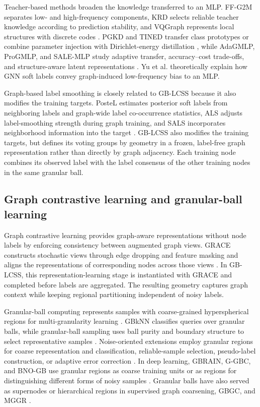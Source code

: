 \documentclass[10pt,letterpaper]{elsarticle}
\begin{document}
Teacher-based methods broaden the knowledge transferred to an MLP. FF-G2M separates low- and high-frequency components, KRD selects reliable teacher knowledge according to prediction stability, and VQGraph represents local structures with discrete codes \cite{ref6,ref7,ref26}. PGKD and TINED transfer class prototypes or combine parameter injection with Dirichlet-energy distillation \cite{ref28,ref43}, while AdaGMLP, ProGMLP, and SALE-MLP study adaptive transfer, accuracy--cost trade-offs, and structure-aware latent representations \cite{ref29,ref30,ref31}. Yu et al. \cite{ref32} theoretically explain how GNN soft labels convey graph-induced low-frequency bias to an MLP.

Graph-based label smoothing is closely related to GB-LCSS because it also modifies the training targets. PosteL estimates posterior soft labels from neighboring labels and graph-wide label co-occurrence statistics, ALS adjusts label-smoothing strength during graph training, and SALS incorporates neighborhood information into the target \cite{ref60,ref61,ref62}. GB-LCSS also modifies the training targets, but defines its voting groups by geometry in a frozen, label-free graph representation rather than directly by graph adjacency. Each training node combines its observed label with the label consensus of the other training nodes in the same granular ball.

\subsection{Graph contrastive learning and granular-ball learning}\label{sec:2.4}

Graph contrastive learning provides graph-aware representations without node labels by enforcing consistency between augmented graph views. GRACE constructs stochastic views through edge dropping and feature masking and aligns the representations of corresponding nodes across those views \cite{ref16}. In GB-LCSS, this representation-learning stage is instantiated with GRACE and completed before labels are aggregated. The resulting geometry captures graph context while keeping regional partitioning independent of noisy labels.

Granular-ball computing represents samples with coarse-grained hyperspherical regions for multi-granularity learning \cite{ref34}. GBkNN classifies queries over granular balls, while granular-ball sampling uses ball purity and boundary structure to select representative samples \cite{ref34,ref37}. Noise-oriented extensions employ granular regions for coarse representation and classification, reliable-sample selection, pseudo-label construction, or adaptive error correction \cite{ref35,ref36,ref52,ref53}. In deep learning, GBRAIN, G-GBC, and BNO-GB use granular regions as coarse training units or as regions for distinguishing different forms of noisy samples \cite{ref48,ref49,ref57}. Granular balls have also served as supernodes or hierarchical regions in supervised graph coarsening, GBGC, and MGGR \cite{ref54,ref55,ref56}.
\end{document}
